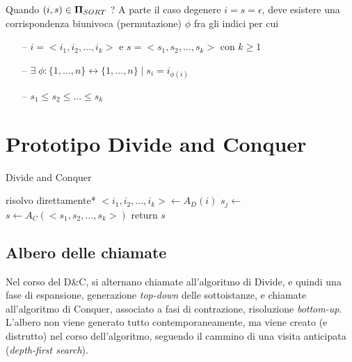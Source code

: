 Quando $ (i,s) \in \bm{\Pi}{}_{SORT} $ ? A parte il caso degenere $i=s=\epsilon$, deve esistere una corrispondenza biunivoca (permutazione) $\phi$ fra gli indici per cui
\begin{itemize}[noitemsep,parsep=0pt,partopsep=0pt]
    \item[--] $i = <i_1, i_2, \dots, i_k> $ e $ s = <s_1, s_2, \dots, s_k> $ con $k \geq 1$
    \item[--] $ \exists \;\phi:\{1, \dots, n\} \leftrightarrow \{1, \dots, n\} \;|\; s_i = i_{\phi(i)}$
    \item[--] $ s_1 \leq s_2 \leq \dots \leq s_k$ 
\end{itemize}

\section{Prototipo Divide and Conquer}

\begin{algorithm}[H]
\caption{Divide and Conquer}\label{alg:dnc}
\begin{algorithmic}[1]
                                     
            \State *risolvo direttamente*
        \EndIf
        \State $<i_1, i_2, \dots, i_k> \gets A_D(i)$    
                            
            \State $s_j \gets $ 
        \EndFor
        \State $s \gets A_C(<s_1, s_2, \dots, s_k>)$    
        \State return $s$
    \EndProcedure
\end{algorithmic}
\end{algorithm}

\subsection{Albero delle chiamate}
Nel corso del D\&C, si alternano chiamate all'algoritmo di Divide, e quindi una fase di espansione, generazione \textit{top-down} delle sottoistanze, e chiamate all'algoritmo di Conquer, associato a fasi di contrazione, risoluzione \textit{bottom-up}. L'albero non viene generato tutto contemporaneamente, ma viene creato (e distrutto) nel corso dell'algoritmo, seguendo il cammino di una visita anticipata (\textit{depth-first search}).

